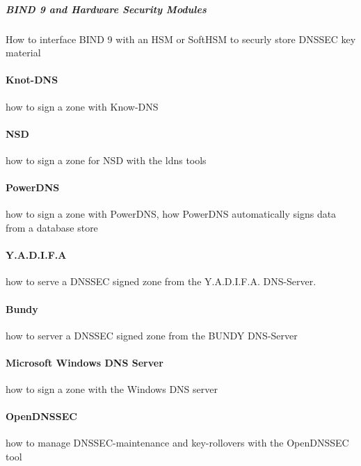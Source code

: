 \subparagraph{BIND 9 and Hardware Security Modules}

How to interface BIND 9 with an HSM or SoftHSM to securly store DNSSEC
key material

\paragraph{Knot-DNS}

how to sign a zone with Know-DNS

\paragraph{NSD}

how to sign a zone for NSD with the ldns tools

\paragraph{PowerDNS}

how to sign a zone with PowerDNS, how PowerDNS automatically signs
data from a database store

\paragraph{Y.A.D.I.F.A}

how to serve a DNSSEC signed zone from the Y.A.D.I.F.A. DNS-Server.

\paragraph{Bundy}

how to server a DNSSEC signed zone from the BUNDY DNS-Server

\paragraph{Microsoft Windows DNS Server}

how to sign a zone with the Windows DNS server

\paragraph{OpenDNSSEC}

how to manage DNSSEC-maintenance and key-rollovers with the OpenDNSSEC
tool

